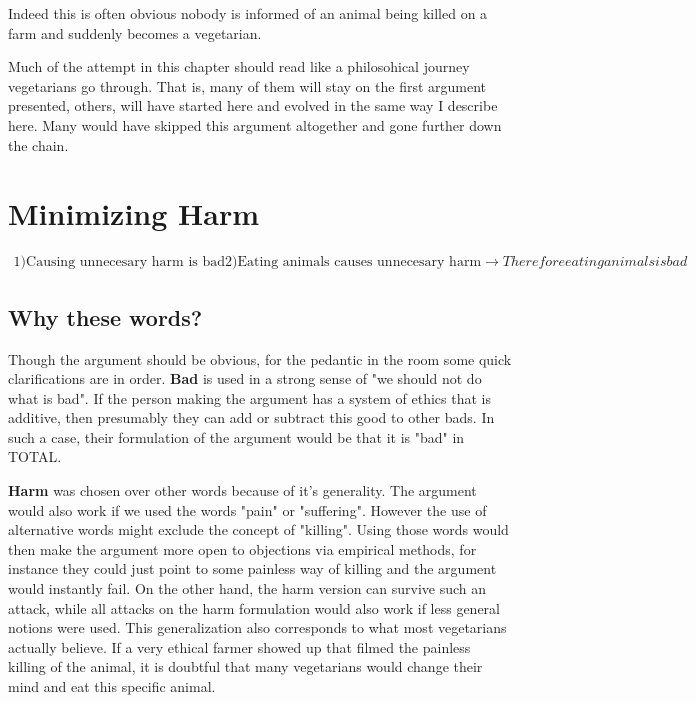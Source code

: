\documentclass[12pt]{report}
\numberwithin{equation}{section}
\begin{document}
Indeed this is often obvious nobody is informed of an animal being killed on a farm and suddenly becomes a vegetarian.

Much of the attempt in this chapter should read like a philosohical journey vegetarians go through. That is, many of them will stay on the first argument presented, others, will have started here and evolved in the same way I describe here. Many would have skipped this argument altogether and gone further down the chain. 

\section{Minimizing Harm}

\begin{align*}
1) \text{Causing unnecesary harm is bad}
2) \text{Eating animals causes unnecesary harm}
\rightarrow Therefore eating animals is bad
\end{align*}

\subsection{Why these words?}

Though the argument should be obvious, for the pedantic in the room some quick clarifications are in order. \textbf{Bad} is used in a strong sense of "we should not do what is bad". If the person making the argument has a system of ethics that is additive, then presumably they can add or subtract this good to other bads. In such a case, their formulation of the argument would be that it is "bad" in TOTAL.  

\textbf{Harm} was chosen over other words because of it's generality. The argument would also work if we used the words "pain" or "suffering". However the use of alternative words might exclude the concept of "killing". Using those words would then make the argument more open to objections via empirical methods, for instance they could just point to some painless way of killing and the argument would instantly fail. On the other hand, the harm version can survive such an attack, while all attacks on the harm formulation would also work if less general notions were used. This generalization also corresponds to what most vegetarians actually believe. If a very ethical farmer showed up that filmed the painless killing of the animal, it is doubtful that many vegetarians would change their mind and eat this specific animal. 
\end{document}
